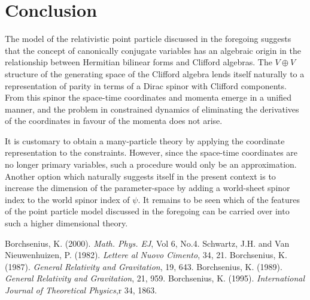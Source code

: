 \documentclass[a4paper,a4paper]{article}
\begin{document}
\section{Conclusion}
The model of the relativistic point particle discussed in the foregoing
suggests that the concept of canonically conjugate variables has an algebraic
origin in the relationship between Hermitian bilinear forms and Clifford
algebras. The $V\oplus V$ structure of the generating space of the Clifford
algebra lends itself naturally to a representation of parity in terms of a Dirac
spinor with Clifford components. From this spinor the space-time coordinates
and momenta emerge in a unified manner, and the problem in constrained dynamics
of eliminating the derivatives of the coordinates in favour of the momenta does
not arise. 

It is customary to obtain a many-particle theory by applying the coordinate
representation to the constraints. However, since the space-time coordinates are
no longer primary variables, such a procedure would only be an approximation.
Another option which naturally suggests itself in the present context is to
increase the dimension of the parameter-space by adding a world-sheet spinor
index to the world spinor index of $\psi $. It remains to be seen which of the
features of the point particle model discussed in the foregoing can be
carried over into such a higher dimensional theory.        
\begin{thebibliography}{99}
Borchsenius, K. (2000). \emph{Math. Phys. EJ}, Vol 6, No.4.
Schwartz, J.H. and Van
Nieuwenhuizen, P. (1982). \emph{Lettere al Nuovo
Cimento}, 34, 21. 
Borchsenius, K. (1987).
\emph{General Relativity and Gravitation}, 19, 643.
Borchsenius, K. (1989).
\emph{General Relativity and Gravitation}, 21, 959.
Borchsenius, K. (1995).
\emph{International Journal of Theoretical Physics},r
34, 1863. 

\end{thebibliography}
\end{document}
